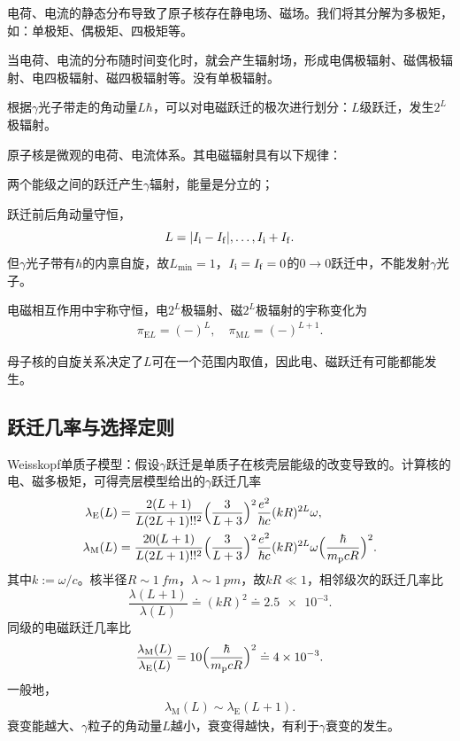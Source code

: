 电荷、电流的静态分布导致了原子核存在静电场、磁场。我们将其分解为多极矩，如：单极矩、偶极矩、四极矩等。

当电荷、电流的分布随时间变化时，就会产生辐射场，形成电偶极辐射、磁偶极辐射、电四极辐射、磁四极辐射等。没有单极辐射。

根据$\gamma$光子带走的角动量$L\hbar$，可以对电磁跃迁的极次进行划分：$L$级跃迁，发生$2^L$极辐射。

原子核是微观的电荷、电流体系。其电磁辐射具有以下规律：
\begin{compactenum}
	\item 两个能级之间的跃迁产生$\gamma$辐射，能量是分立的；
	\item 跃迁前后角动量守恒，
	\begin{equation}\label{eq:nrd-gamma-angular-momentum}
		L = \lvert I_\mathrm i - I_\mathrm f\rvert,\ldots,I_\mathrm i + I_\mathrm f.
	\end{equation}
	但$\gamma$光子带有$\hbar$的内禀自旋，故$L_{\min} = 1$，$I_\mathrm i = I_\mathrm f = 0$的$0 \to 0$跃迁中，不能发射$\gamma$光子。
	\item 电磁相互作用中宇称守恒，电$2^L$极辐射、磁$2^L$极辐射的宇称变化为
	\begin{align}
		\pi_{\mathrm{E}L} = (-)^L,\quad\pi_{\mathrm{M}L} = (-)^{L+1}.
	\end{align}
\end{compactenum}
母子核的自旋关系决定了$L$可在一个范围内取值，因此电、磁跃迁有可能都能发生。

\subsection{\gammaray 跃迁几率与选择定则}

Weisskopf单质子模型：假设$\gamma$跃迁是单质子在核壳层能级的改变导致的。计算核的电、磁多极矩，可得壳层模型给出的$\gamma$跃迁几率
\begin{subequations}\label{eq:nrd-weisskopf-transition-rates}
	\begin{align}
		\lambda_{\mathrm{E}}(L) &= \frac{2(L + 1)}{L(2L + 1)!!^2}\Bigl(\frac{3}{L + 3}\Bigr)^2\frac{e^2}{\hbar c}(kR)^{2L}\omega,\\
		\lambda_{\mathrm{M}}(L) &= \frac{20(L + 1)}{L(2L + 1)!!^2}\Bigl(\frac{3}{L + 3}\Bigr)^2\frac{e^2}{\hbar c}(kR)^{2L}\omega\Bigl(\frac\hbar{m_{\mathrm{p}} cR}\Bigr)^2.
	\end{align}
\end{subequations}
其中$k := \omega/c$。核半径$R \sim \qty{1}{fm}$，$\lambda \sim \qty{1}{pm}$，故$kR \ll 1$，相邻级次的跃迁几率比
\[
	\frac{\lambda(L + 1)}{\lambda(L)} \doteq (kR)^2 \doteq \num{2.5e-3}.
\]
同级的电磁跃迁几率比
\[
	\frac{\lambda_{\mathrm{M}}(L)}{\lambda_{\mathrm{E}}(L)} = 10\Bigl(\frac\hbar{m_{\mathrm{p}} cR}\Bigr)^2 \doteq \num{4e-3}.
\]
一般地，
\begin{align}
	\lambda_{\mathrm{M}}(L) \sim \lambda_{\mathrm{E}}(L + 1).
\end{align}
衰变能越大、$\gamma$粒子的角动量$L$越小，衰变得越快，有利于$\gamma$衰变的发生。%

